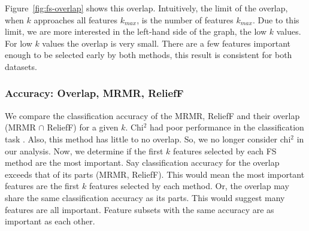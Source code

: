 \documentclass[runningheads]{llncs}
\begin{document}
Figure~\ref{fig:fs-overlap} shows this overlap.
Intuitively, the limit of the overlap, when $k$ approaches all features $k_{max}$, is the number of features $k_{max}$.
Due to this limit, we are more interested in the left-hand side of the graph, the low $k$ values.
For low $k$ values the overlap is very small.
There are a few features important enough to be selected early by both methods, this result is consistent for both datasets.

\subsubsection{Accuracy: Overlap, MRMR, ReliefF}
\label{sec:results-visualisation-accuracy-overlap-mrmr-reliefF}

We compare the classification accuracy of the MRMR, ReliefF and their overlap (MRMR $\cap$ ReliefF) for a given $k$.
Chi$^2$ had poor performance in the classification task \cite{wood2021feature}.
Also, this method has little to no overlap. So, we no longer consider chi$^2$ in our analysis.
Now, we determine if the first $k$ features selected by each FS method are the most important.
Say classification accuracy for the overlap exceeds that of its parts (MRMR, ReliefF).
This would mean the most important features are the first $k$ features selected by each method.
Or, the overlap may share the same classification accuracy as its parts.
This would suggest many features are all important.
Feature subsets with the same accuracy are as important as each other.
\end{document}
